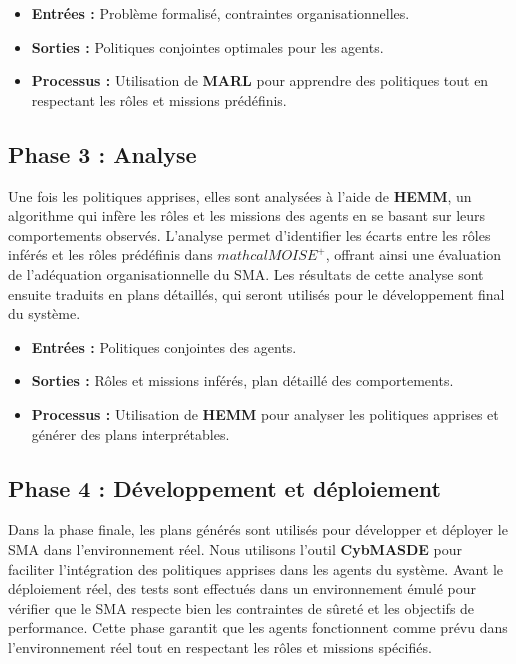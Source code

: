 \documentclass[sigconf,anonymous]{aamas}
\begin{document}
\begin{itemize}
  \item \textbf{Entrées :} Problème formalisé, contraintes organisationnelles.
  \item \textbf{Sorties :} Politiques conjointes optimales pour les agents.
  \item \textbf{Processus :} Utilisation de \textbf{MARL} pour apprendre des politiques tout en respectant les rôles et missions prédéfinis.
\end{itemize}

\subsection{Phase 3 : Analyse}
Une fois les politiques apprises, elles sont analysées à l'aide de \textbf{HEMM}, un algorithme qui infère les rôles et les missions des agents en se basant sur leurs comportements observés. L'analyse permet d'identifier les écarts entre les rôles inférés et les rôles prédéfinis dans \textbf{$mathcal{M}OISE^+$}, offrant ainsi une évaluation de l'adéquation organisationnelle du SMA. Les résultats de cette analyse sont ensuite traduits en plans détaillés, qui seront utilisés pour le développement final du système.

\begin{itemize}
  \item \textbf{Entrées :} Politiques conjointes des agents.
  \item \textbf{Sorties :} Rôles et missions inférés, plan détaillé des comportements.
  \item \textbf{Processus :} Utilisation de \textbf{HEMM} pour analyser les politiques apprises et générer des plans interprétables.
\end{itemize}

\subsection{Phase 4 : Développement et déploiement}
Dans la phase finale, les plans générés sont utilisés pour développer et déployer le SMA dans l'environnement réel. Nous utilisons l'outil \textbf{CybMASDE} pour faciliter l'intégration des politiques apprises dans les agents du système. Avant le déploiement réel, des tests sont effectués dans un environnement émulé pour vérifier que le SMA respecte bien les contraintes de sûreté et les objectifs de performance. Cette phase garantit que les agents fonctionnent comme prévu dans l'environnement réel tout en respectant les rôles et missions spécifiés.
\end{document}
